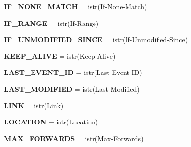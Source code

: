\begin{DoxyCompactItemize}
\item 
\mbox{\label{namespaceaiohttp_1_1hdrs_a17ae743abe1830338962378062aaad32}} 
{\bfseries I\+F\+\_\+\+N\+O\+N\+E\+\_\+\+M\+A\+T\+CH} = istr(\textquotesingle{}If-\/None-\/Match\textquotesingle{})
\item 
\mbox{\label{namespaceaiohttp_1_1hdrs_af8b21e542e8b60df964ab4dead0ccfed}} 
{\bfseries I\+F\+\_\+\+R\+A\+N\+GE} = istr(\textquotesingle{}If-\/Range\textquotesingle{})
\item 
\mbox{\label{namespaceaiohttp_1_1hdrs_a35373153f97821594eb81d327a7af086}} 
{\bfseries I\+F\+\_\+\+U\+N\+M\+O\+D\+I\+F\+I\+E\+D\+\_\+\+S\+I\+N\+CE} = istr(\textquotesingle{}If-\/Unmodified-\/Since\textquotesingle{})
\item 
\mbox{\label{namespaceaiohttp_1_1hdrs_a2c175aefb513c0cbb995aba5f1cb07a5}} 
{\bfseries K\+E\+E\+P\+\_\+\+A\+L\+I\+VE} = istr(\textquotesingle{}Keep-\/Alive\textquotesingle{})
\item 
\mbox{\label{namespaceaiohttp_1_1hdrs_a1e73cfe1fe6d96373af5120844be6e5a}} 
{\bfseries L\+A\+S\+T\+\_\+\+E\+V\+E\+N\+T\+\_\+\+ID} = istr(\textquotesingle{}Last-\/Event-\/ID\textquotesingle{})
\item 
\mbox{\label{namespaceaiohttp_1_1hdrs_a323bf1ebab187cba18c2d394d261be78}} 
{\bfseries L\+A\+S\+T\+\_\+\+M\+O\+D\+I\+F\+I\+ED} = istr(\textquotesingle{}Last-\/Modified\textquotesingle{})
\item 
\mbox{\label{namespaceaiohttp_1_1hdrs_ae22a06970f36a3db4d808b000f23f380}} 
{\bfseries L\+I\+NK} = istr(\textquotesingle{}Link\textquotesingle{})
\item 
\mbox{\label{namespaceaiohttp_1_1hdrs_a1e2b56fa59058cf8e45d567185acb1a5}} 
{\bfseries L\+O\+C\+A\+T\+I\+ON} = istr(\textquotesingle{}Location\textquotesingle{})
\item 
\mbox{\label{namespaceaiohttp_1_1hdrs_a1e7254713726db8eb4d83f4c59e9c609}} 
{\bfseries M\+A\+X\+\_\+\+F\+O\+R\+W\+A\+R\+DS} = istr(\textquotesingle{}Max-\/Forwards\textquotesingle{})

\end{DoxyCompactItemize}
